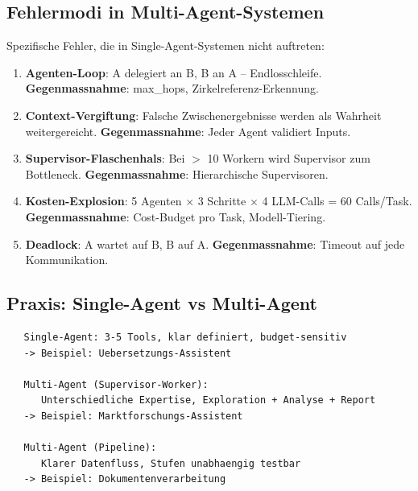 \subsection{Fehlermodi in Multi-Agent-Systemen}


Spezifische Fehler, die in Single-Agent-Systemen nicht auftreten:

\begin{enumerate}[leftmargin=*]
    \item \textbf{Agenten-Loop}: A delegiert an B, B an A -- Endlosschleife. \textbf{Gegenmassnahme}: max\_hops, Zirkelreferenz-Erkennung.
    \item \textbf{Context-Vergiftung}: Falsche Zwischenergebnisse werden als Wahrheit weitergereicht. \textbf{Gegenmassnahme}: Jeder Agent validiert Inputs.
    \item \textbf{Supervisor-Flaschenhals}: Bei $>$ 10 Workern wird Supervisor zum Bottleneck. \textbf{Gegenmassnahme}: Hierarchische Supervisoren.
    \item \textbf{Kosten-Explosion}: 5 Agenten $\times$ 3 Schritte $\times$ 4 LLM-Calls = 60 Calls/Task. \textbf{Gegenmassnahme}: Cost-Budget pro Task, Modell-Tiering.
    \item \textbf{Deadlock}: A wartet auf B, B auf A. \textbf{Gegenmassnahme}: Timeout auf jede Kommunikation.
\end{enumerate}

\subsection{Praxis: Single-Agent vs Multi-Agent}

\begin{verbatim}
   Single-Agent: 3-5 Tools, klar definiert, budget-sensitiv
   -> Beispiel: Uebersetzungs-Assistent

   Multi-Agent (Supervisor-Worker):
      Unterschiedliche Expertise, Exploration + Analyse + Report
   -> Beispiel: Marktforschungs-Assistent

   Multi-Agent (Pipeline):
      Klarer Datenfluss, Stufen unabhaengig testbar
   -> Beispiel: Dokumentenverarbeitung
\end{verbatim}

